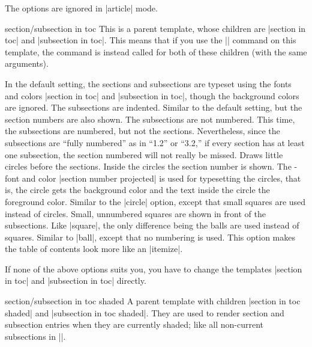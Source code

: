 \begin{command}{\tableofcontents{}}
  \articlenote
  The options are ignored in |article| mode.

  \begin{element}{section/subsection in toc}\semiyes\no\no
    This is a parent template, whose children are |section in toc| and |subsection in toc|. This means that if you use the |\setbeamertemplate| command on this template, the command is instead called for both of these children (with the same arguments).

    \begin{templateoptions}
      In the default setting, the sections and subsections are typeset using the fonts and colors |section in toc| and |subsection in toc|, though the background colors are ignored. The subsections are indented.
      Similar to the default setting, but the section numbers are also shown. The subsections are not numbered.
      This time, the subsections are numbered, but not the sections. Nevertheless, since the subsections are ``fully numbered'' as in ``1.2'' or ``3.2,'' if every section has at least one subsection, the section numbered will not really be missed.
      Draws little circles before the sections. Inside the circles the section number is shown. The \beamer-font and color |section number projected| is used for typesetting the circles, that is, the circle gets the background color and the text inside the circle the foreground color.
      Similar to the |circle| option, except that small squares are used instead of circles. Small, unnumbered squares are shown in front of the subsections.
      Like |square|, the only difference being the balls are used instead of squares.
      Similar to |ball|, except that no numbering is used. This option makes the table of contents look more like an |itemize|.
    \end{templateoptions}

    If none of the above options suits you, you have to change the templates |section in toc| and |subsection in toc| directly.
  \end{element}

  \begin{element}{section/subsection in toc shaded}\semiyes\no\no
    A parent template with children |section in toc shaded| and |subsection in toc shaded|. They are used to render section and subsection entries when they are currently shaded; like all non-current subsections in |\tableofcontents[currentsubsection]|.


\end{element}
\end{command}
